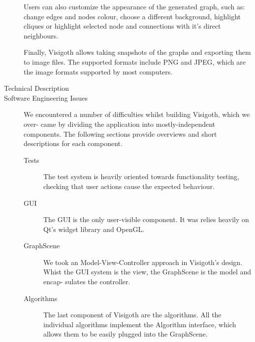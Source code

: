 \documentclass[a4paper,11pt]{article}
\begin{document}
\begin{description}
  Users can also customize the appearance of the generated graph, such
  as: change edges and nodes colour, choose a different background,
  highlight cliques or highlight selected node and connections with
  it's direct neighbours.

  Finally, Visigoth allows taking snapshots of the graphs and
  exporting them to image files. The supported formats include PNG and
  JPEG, which are the image formats supported by most computers.

\item[Technical Description]

\item[Software Engineering Issues]

  We encountered a number of difficulties whilst building Visigoth,
  which we over- came by dividing the application into
  mostly-independent components.  The following sections provide
  overviews and short descriptions for each component.

  \begin{description}
  \item[Tests] The test system is heavily oriented towards
    functionality testing, checking that user actions cause the
    expected behaviour.

  \item[GUI] The GUI is the only user-visible component. It was relies
    heavily on Qt's widget library and OpenGL.

  \item[GraphScene] We took an Model-View-Controller approach in
    Visigoth's design. Whist the GUI system is the view, the
    GraphScene is the model and encap- sulates the controller.

  \item[Algorithms] The last component of Visigoth are the
    algorithms. All the individual algorithms implement the Algorithm
    interface, which allows them to be easily plugged into the
    GraphScene.
  \end{description}


\end{description}
\end{document}
